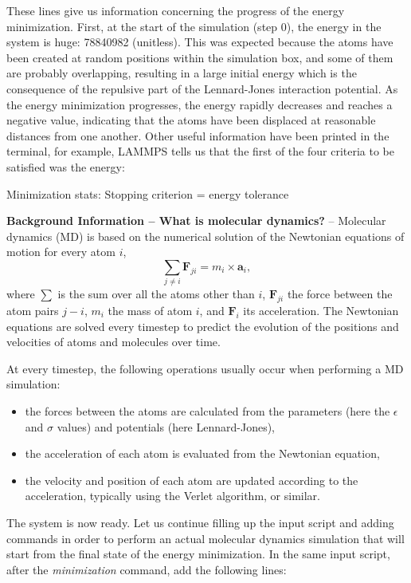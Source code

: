 \noindent These lines give us information concerning
the progress of the energy minimization. First, at the start
of the simulation (step 0), the energy in the system is
huge: 78840982 (unitless). This was expected because
the atoms have been created at random positions within the
simulation box, and some of them are probably overlapping,
resulting in a large initial energy which is the consequence
of the repulsive part of the Lennard-Jones interaction
potential. As the energy minimization progresses, the energy
rapidly decreases and reaches a negative value, indicating that the atoms have been
displaced at reasonable distances from one another. Other
useful information have been printed in the terminal, for
example, LAMMPS tells us that the first of the four criteria
to be satisfied was the energy:

\begin{lcverbatim}
Minimization stats:
Stopping criterion = energy tolerance
\end{lcverbatim}

\noindent \noindent \textbf{Background Information -- What is molecular dynamics?} -- Molecular dynamics (MD) is based on the numerical solution of the Newtonian
equations of motion for every atom $i$,
$$\sum_{j \ne i} \boldsymbol{F}_{ji} = m_i \times \boldsymbol{a}_i,$$
where $\sum$ is the sum over all the atoms other than $i$, 
$\boldsymbol{F}_{ji}$ the force between the atom pairs $j-i$,
$m_i$ the mass of atom $i$, and $\boldsymbol{F}_i$ its acceleration. 
The Newtonian equations are solved every timestep to predict the
evolution of the positions and velocities of atoms and molecules over time. 

At every timestep, the following operations usually occur when 
performing a MD simulation:
\begin{itemize}
\item the forces between the atoms are calculated from the parameters (here the $\epsilon$ and $\sigma$ values) and potentials (here Lennard-Jones),
\item the acceleration of each atom is evaluated from the Newtonian equation,
\item the velocity and position of each atom are updated according to the acceleration, typically using the Verlet algorithm, or similar.
\end{itemize}

The system is now ready. Let us continue filling up the
input script and adding commands in order to perform an actual molecular dynamics
simulation that will start from the final state of the energy minimization.
In the same input script, after the \textit{minimization} command, add the following
lines:


